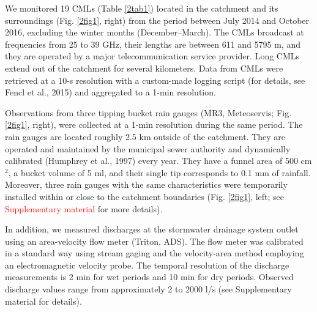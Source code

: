 \documentclass{ctuthesis}\usepackage[]{graphicx}\usepackage[]{color}
\begin{document}
We monitored 19 CMLs (Table \ref{2tab1}) located in the catchment and its surroundings (Fig. \ref{2fig1}, right) from the period between July 2014 and October 2016, excluding the winter months (December--March). The CMLs broadcast at frequencies from 25 to 39 GHz, their lengths are between 611 and 5795 m, and they are operated by a major telecommunication service provider. Long CMLs extend out of the catchment for several kilometers. Data from CMLs were retrieved at a 10-s resolution with a custom-made logging script (for details, see Fencl et al., 2015) and aggregated to a 1-min resolution.

Observations from three tipping bucket rain gauges (MR3, Meteoservis; Fig. \ref{2fig1}, right), were collected at a 1-min resolution during the same period. The rain gauges are located roughly 2.5 km outside of the catchment. They are operated and maintained by the municipal sewer authority and dynamically calibrated (Humphrey et al., 1997) every year. They have a funnel area of 500 cm$^2$, a bucket volume of 5 ml, and their single tip corresponds to 0.1 mm of rainfall. Moreover, three rain gauges with the same characteristics were temporarily installed within or close to the catchment boundaries (Fig. \ref{2fig1}, left; see \textcolor{red}{Supplementary material} for more details).

In addition, we measured discharges at the stormwater drainage system outlet using an area-velocity flow meter (Triton, ADS). The flow meter was calibrated in a standard way using stream gaging and the velocity-area method employing an electromagnetic velocity probe. The temporal resolution of the discharge measurements is 2 min for wet periods and 10 min for dry periods. Observed discharge values range from approximately 2 to 2000 l/s (see Supplementary material for details).
\end{document}
